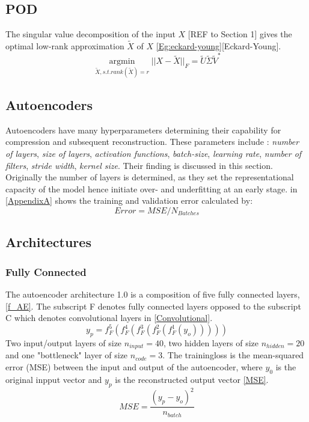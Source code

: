 \documentclass[12pt, a4paper]{article}
\begin{document}
\subsection{POD}
The singular value decomposition of the input $X$ [REF to Section 1] gives the optimal low-rank approximation $\tilde{X}$ of $X$ \cref{Eg:eckard-young}[Eckard-Young]. 
\begin{equation}
\underset{\tilde{X}, s.t. rank(\tilde{X})=r}{\operatorname{argmin}} || X -\tilde{X} ||_F=\tilde{U}\tilde{\Sigma}\tilde{V}^*
\label{Eg:eckard-young}
\end{equation}
\subsection{Autoencoders}
Autoencoders have many hyperparameters determining their capability for compression and subsequent reconstruction. These parameters include : \textit{number of layers}, \textit{size of layers}, \textit{activation functions}, \textit{batch-size}, \textit{learning rate}, \textit{number of filters}, \textit{stride width}, \textit{kernel size}. Their finding is discussed in this section.\\
Originally the number of layers is determined, as they set the representational capacity of the model hence initiate over- and underfitting at an early stage.  in \cref{AppendixA} shows the training and validation error calculated by:
\begin{equation}
	Error = MSE / N_{Batches}
\end{equation}

\subsection{Architectures}
\subsubsection{Fully Connected}\label{Fully Connected}
The autoencoder architecture 1.0 is a composition of five fully connected layers, \cref{f_AE}. The subscript F denotes fully connected layers opposed to the subscript C which denotes convolutional layers in \cref{Convolutional}.
\begin{equation}
	y_p = f_{F}^5(f_{F}^4(f_{F}^3(f_{F}^2(f_{F}^1(y_o)))))
	\label{f_AE}
\end{equation}
Two input/output layers of size $n_{input}=40$, two hidden layers of size $n_{hidden} = 20$ and one "bottleneck" layer of size $n_{code} = 3$. The trainingloss is the mean-squared error (MSE) between the input and output of the autoencoder, where $y_0$ is the original inpput vector and $y_p$ is the reconstructed output vector \cref{MSE}.
\begin{equation}
	MSE = \frac{(y_p - y_o)^2}{n_{batch}}
	\label{MSE}
\end{equation}
\end{document}

